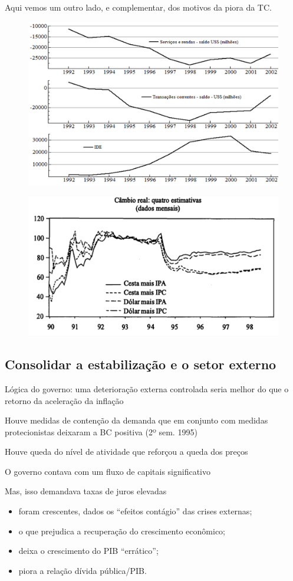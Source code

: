 \documentclass[a4paper,12pt]{article}[abntex2]
\begin{document}
Aqui vemos um outro lado, e complementar, dos motivos da piora da TC.

\begin{figure}[H]
    \centering
    \includegraphics[width=0.7\linewidth]{Imagens/a14i5.png}
\end{figure}

\begin{figure}[H]
    \centering
    \includegraphics[width=0.7\linewidth]{Imagens/a14i6.png}
\end{figure}

\subsection{\textbf{Consolidar a estabilização e o setor externo}}

Lógica do governo: uma deterioração externa controlada seria melhor do que o retorno da aceleração da inflação

Houve medidas de contenção da demanda que em conjunto com medidas protecionistas deixaram a BC positiva (2º sem. 1995)

Houve queda do nível de atividade que reforçou a queda dos preços

O governo contava com um fluxo de capitais significativo

Mas, isso demandava taxas de juros elevadas\begin{itemize}
    \item foram crescentes, dados os “efeitos contágio” das crises externas;
    \item o que prejudica a recuperação do crescimento econômico;
    \item deixa o crescimento do PIB “errático”;
    \item piora a relação dívida pública/PIB.
\end{itemize}
\end{document}
